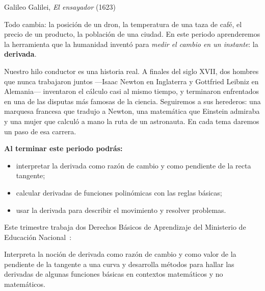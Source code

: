 \documentclass[11pt]{article}
\begin{document}
\encabezado

{Galileo Galilei, \emph{El ensayador} (1623)}


Todo cambia: la posición de un dron, la temperatura de una taza de café,
el precio de un producto, la población de una ciudad. En este periodo
aprenderemos la herramienta que la humanidad inventó para \emph{medir el
cambio en un instante}: la \textbf{derivada}.

Nuestro hilo conductor es una historia real. A finales del siglo XVII, dos
hombres que nunca trabajaron juntos ---Isaac Newton en Inglaterra y
Gottfried Leibniz en Alemania--- inventaron el cálculo casi al mismo
tiempo, y terminaron enfrentados en una de las disputas más famosas de la
ciencia. Seguiremos a sus herederos: una marquesa francesa que tradujo a
Newton, una matemática que Einstein admiraba y una mujer que calculó a
mano la ruta de un astronauta. En cada tema daremos un paso de esa carrera.

\textbf{Al terminar este periodo podrás:}
\begin{itemize}
  \item interpretar la derivada como razón de cambio y como pendiente de
        la recta tangente;
  \item calcular derivadas de funciones polinómicas con las reglas básicas;
  \item usar la derivada para describir el movimiento y resolver problemas.
\end{itemize}

Este trimestre trabaja dos Derechos Básicos de Aprendizaje del Ministerio de
Educación Nacional~\cite{mendba}:

\begin{dba}
Interpreta la noción de derivada como razón de cambio y como valor de la
pendiente de la tangente a una curva y desarrolla métodos para hallar las
derivadas de algunas funciones básicas en contextos matemáticos y no
matemáticos.
\end{dba}
\end{document}
